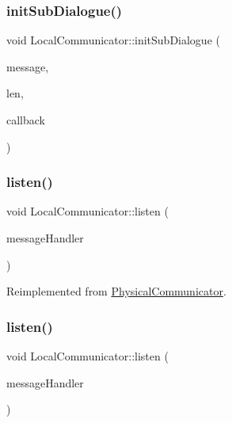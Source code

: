 \subsubsection{\texorpdfstring{init\+Sub\+Dialogue()}{initSubDialogue()}}
{\footnotesize\ttfamily void Local\+Communicator\+::init\+Sub\+Dialogue (\begin{DoxyParamCaption}\item[{\hyperlink{structSpaMessage}{Spa\+Message} $\ast$}]{message,  }\item[{size\+\_\+t}]{len,  }\item[{std\+::function$<$ void(\hyperlink{structcubiumClientSocket__t}{cubium\+Client\+Socket\+\_\+t} $\ast$)$>$}]{callback }\end{DoxyParamCaption})}

\mbox{\label{classLocalCommunicator_a320a09f88a1eb840e517753b603cd08b}} 
\subsubsection{\texorpdfstring{listen()}{listen()}\hspace{0.1cm}{\footnotesize\ttfamily [1/2]}}
{\footnotesize\ttfamily void Local\+Communicator\+::listen (\begin{DoxyParamCaption}\item[{std\+::function$<$ void(\hyperlink{structcubiumServerSocket__t}{cubium\+Server\+Socket\+\_\+t} $\ast$)$>$}]{message\+Handler }\end{DoxyParamCaption})\hspace{0.3cm}{\ttfamily [virtual]}}



Reimplemented from \hyperlink{classPhysicalCommunicator_a4886f4453c1f830ceaef56bc8602423f}{Physical\+Communicator}.

\mbox{\label{classLocalCommunicator_a33c7148ee35ec38773b7b4c8f32c643c}} 
\subsubsection{\texorpdfstring{listen()}{listen()}\hspace{0.1cm}{\footnotesize\ttfamily [2/2]}}
{\footnotesize\ttfamily void Local\+Communicator\+::listen (\begin{DoxyParamCaption}\item[{std\+::function$<$ void(\hyperlink{structcubiumClientSocket__t}{cubium\+Client\+Socket\+\_\+t} $\ast$)$>$}]{message\+Handler }\end{DoxyParamCaption})\hspace{0.3cm}{\ttfamily [virtual]}}

